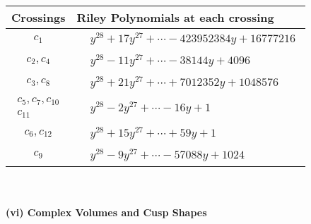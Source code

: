 \documentclass[1p]{elsarticle_modified}
\theoremstyle{definition}
\begin{document}
\begin{tabular}{m{50pt}|m{274pt}}
Crossings & \hspace{64pt}Riley Polynomials at each crossing \\
\hline $$\begin{aligned}c_{1}\end{aligned}$$&$\begin{aligned}
&y^{28}+17 y^{27}+\cdots-423952384 y+16777216
\end{aligned}$\\
\hline $$\begin{aligned}c_{2},c_{4}\end{aligned}$$&$\begin{aligned}
&y^{28}-11 y^{27}+\cdots-38144 y+4096
\end{aligned}$\\
\hline $$\begin{aligned}c_{3},c_{8}\end{aligned}$$&$\begin{aligned}
&y^{28}+21 y^{27}+\cdots+7012352 y+1048576
\end{aligned}$\\
\hline $$\begin{aligned}c_{5},c_{7},c_{10}\\c_{11}\end{aligned}$$&$\begin{aligned}
&y^{28}-2 y^{27}+\cdots-16 y+1
\end{aligned}$\\
\hline $$\begin{aligned}c_{6},c_{12}\end{aligned}$$&$\begin{aligned}
&y^{28}+15 y^{27}+\cdots+59 y+1
\end{aligned}$\\
\hline $$\begin{aligned}c_{9}\end{aligned}$$&$\begin{aligned}
&y^{28}-9 y^{27}+\cdots-57088 y+1024
\end{aligned}$\\
\hline
\end{tabular}\\~\\
\newpage\flushleft \textbf{(vi) Complex Volumes and Cusp Shapes}
\end{document}

